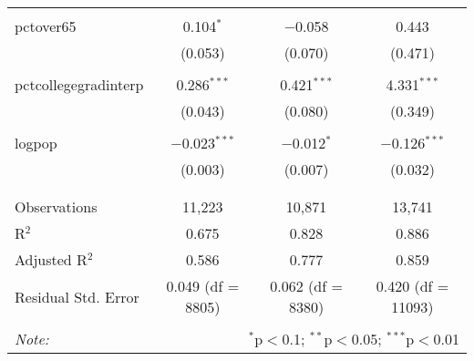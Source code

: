 \documentclass[]{article}
\begin{document}
\begin{table}[!htbp]
\begin{tabular}{@{\extracolsep{5pt}}lccc}
  & & & \\ 
 pctover65 & 0.104$^{*}$ & $-$0.058 & 0.443 \\ 
  & (0.053) & (0.070) & (0.471) \\ 
  & & & \\ 
 pctcollegegradinterp & 0.286$^{***}$ & 0.421$^{***}$ & 4.331$^{***}$ \\ 
  & (0.043) & (0.080) & (0.349) \\ 
  & & & \\ 
 logpop & $-$0.023$^{***}$ & $-$0.012$^{*}$ & $-$0.126$^{***}$ \\ 
  & (0.003) & (0.007) & (0.032) \\ 
  & & & \\ 
\hline \\[-1.8ex] 
Observations & 11,223 & 10,871 & 13,741 \\ 
R$^{2}$ & 0.675 & 0.828 & 0.886 \\ 
Adjusted R$^{2}$ & 0.586 & 0.777 & 0.859 \\ 
Residual Std. Error & 0.049 (df = 8805) & 0.062 (df = 8380) & 0.420 (df = 11093) \\ 
\hline 
\hline \\[-1.8ex] 
\textit{Note:}  & \multicolumn{3}{r}{$^{*}$p$<$0.1; $^{**}$p$<$0.05; $^{***}$p$<$0.01} \\ 
\end{tabular} 
\end{table}
\end{document}
